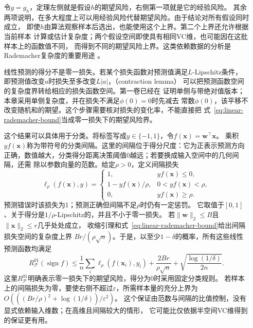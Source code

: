 令$g=g_h$，定理左侧就是假设$h$的期望风险，右侧第一项就是它的经验风险。
其余两项说明，在多大程度上可以用经验风险代替期望风险。由于结论对所有假设同时成立，
即使$h$由算法观察样本后选出，也能使用这个上界。第二个上界还允许根据当前样本
计算或估计复杂度；两个假设空间即使具有相同VC维，也可能因在这批样本上的函数值不同，
而得到不同的期望风险上界。这类依赖数据的分析是Rademacher复杂度的重要用途
。

线性预测的得分不是零一损失。若某个损失函数对预测值满足$L$-Lipschitz条件，
即预测值改变$a$时损失至多改变$L|a|$，（contraction lemma）
可以把预测函数空间的复杂度界转给相应的损失函数空间。第一卷已经在
证明单侧与带绝对值版本；本章采用单侧复杂度，并在损失不满足$\phi(0)=0$时先减去
常数$\phi(0)$，该平移不改变随机和的期望。这个步骤需要核对损失的变化率，不能直接把
式~\eqref{eq:linear-rademacher-bound}当成零一损失下的期望风险界。

这个结果可以具体用于分类。将标签写成$y\in\{-1,1\}$，令$f(\bm x)=\bm w^\top\bm x$。
乘积$yf(\bm x)$称为带符号的分类间隔。这里的间隔位于得分尺度：它为正表示预测方向
正确，数值越大，分类得分距离决策阈值0越远；若要换成输入空间中的几何间隔，还需
除以参数向量的范数。给定$\rho>0$，定义间隔损失
\[
 \ell_\rho(f(\bm x),y)=
 \begin{cases}
  1,&yf(\bm x)\leq0,\\
  1-yf(\bm x)/\rho,&0<yf(\bm x)<\rho,\\
  0,&yf(\bm x)\geq\rho.
 \end{cases}
\]
预测错误时该损失为1；预测正确但间隔不足$\rho$时仍有一定惩罚。
它取值于$[0,1]$、关于得分是$1/\rho$-Lipschitz的，并且不小于零一损失。
若$\|\bm w\|_2\leq B$且$\|\bm x\|_2\leq r$几乎处处成立，
收缩引理和式~\eqref{eq:linear-rademacher-bound}给出间隔损失空间的复杂度上界
$Br/(\rho\sqrt n)$。于是，以至少$1-\delta$的概率，所有这些线性预测函数均满足
\begin{equation}
 R_{\mathcal P}^{01}(\operatorname{sign}f)
 \leq\frac1n\sum_i\ell_\rho(f(\bm x_i),y_i)
 +\frac{2Br}{\rho\sqrt n}
 +\sqrt{\frac{\log(1/\delta)}{2n}}.
 \label{eq:rademacher-margin-risk}
\end{equation}
这里$R_{\mathcal P}^{01}$明确表示零一损失下的期望风险，得分为0时采用固定分类规则。
若样本上的间隔损失为零，要使右侧不超过$\varepsilon$，所需样本量的充分上界为
$O(((Br/\rho)^2+\log(1/\delta))/\varepsilon^2)$。
这个保证由范数与间隔的比值控制，没有显式依赖输入维数；在高维且间隔较大的情形，
它可能比仅依据半空间VC维得到的保证更有用。

